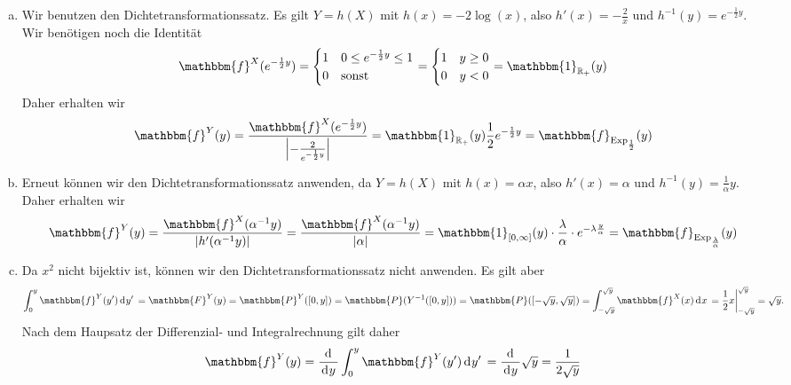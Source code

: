 \documentclass[uebung]{lecture}
\begin{document}
\begin{aufgabe}
    \begin{enumerate}[(a)]
        \item Wir benutzen den Dichtetransformationssatz. Es gilt $Y = h(X)$ mit $h(x) = -2 \log(x)$, also $h'(x) = -\frac{2}{x}$ und $h^{-1}(y) = e^{-\frac{1}{2}y}$. Wir benötigen noch die Identität
        \[
            \mathbbm{f}^X(e^{-\frac{1}{2}y}) = \begin{cases}
                1 & 0 \leq e^{-\frac{1}{2}y} \leq 1\\
                0 & \text{sonst}
            \end{cases} = \begin{cases}
                1 & y \geq 0\\
                0 & y < 0
            \end{cases}
            = \mathbbm{1}_{\R_+}(y)
        \]
        Daher erhalten wir
        \[
            \mathbbm{f}^Y(y) = \frac{\mathbbm{f}^X(e^{-\frac{1}{2}y})}{\left|-\frac{2}{e^{-\frac{1}{2}y}}\right|} = \mathbbm{1}_{\R_+}(y) \frac{1}{2}e^{-\frac{1}{2}y} = \mathbbm{f}_{\text{Exp}_\frac{1}{2}}(y)
        \]
        \item Erneut können wir den Dichtetransformationssatz anwenden, da $Y = h(X)$ mit $h(x) = \alpha x$, also $h'(x) = \alpha$ und $h^{-1}(y) = \frac{1}{\alpha}y$. Daher erhalten wir
        \[
            \mathbbm{f}^Y(y) 
            = \frac{\mathbbm{f}^X(\alpha^{-1}y)}{\left| h'(\alpha^{-1}y)\right|} = \frac{\mathbbm{f}^X(\alpha^{-1}y)}{\left| \alpha\right|}
            = \mathbbm{1}_{[0,\infty]}(y) \cdot \frac{\lambda}{\alpha} \cdot e^{-\lambda \frac{y}{\alpha}} 
            = \mathbbm{f}_{\text{Exp}_\frac{\lambda}{\alpha}}(y)
        \]
        \item Da $x^2$ nicht bijektiv ist, können wir den Dichtetransformationssatz nicht anwenden. Es gilt aber
        \[
            \int_0^y \mathbbm{f}^Y(y') \d{y'} 
            = \mathbbm{F}^Y(y) 
            = \mathbbm{P}^Y([0,y]) 
            = \mathbbm{P}(Y^{-1}([0,y])) 
            = \mathbbm{P}([-\sqrt{y}, \sqrt{y}]) 
            = \int_{-\sqrt{y}}^{\sqrt{y}} \mathbbm{f}^X(x) \d{x} 
            = \frac{1}{2}x \bigg|_{-\sqrt{y}}^{\sqrt{y}} = \sqrt{y}.
        \]
        Nach dem Haupsatz der Differenzial- und Integralrechnung gilt daher 
        \[
            \mathbbm{f}^Y(y) = \frac{\d{}}{\d{y}} \int_0^y \mathbbm{f}^Y(y') \d{y'} = \frac{\d{}}{\d{y}} \sqrt{y} = \frac{1}{2\sqrt{y}}
        \]
    \end{enumerate}
\end{aufgabe}
\end{document}
